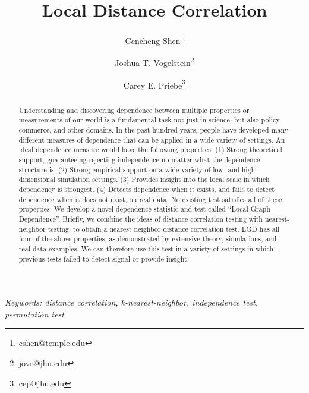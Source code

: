 \documentclass[11pt]{article}
\begin{document}
\def\spacingset#1{\renewcommand{\baselinestretch}%
{#1}\small\normalsize} \spacingset{1}

\title{\bf Local Distance Correlation}
\author[1]{Cencheng Shen\thanks{cshen@temple.edu}}
\author[2]{Joshua T. Vogelstein\thanks{jovo@jhu.edu}}
\author[3]{Carey E. Priebe\thanks{cep@jhu.edu}}
\maketitle


\bigskip
\begin{abstract}
Understanding and discovering dependence between multiple properties or measurements of our world is a fundamental task not just in science, but also policy, commerce, and other domains. In the past hundred years, people have developed many different measures of dependence that can be applied in a wide variety of settings.  An ideal dependence measure would have the following properties. (1) Strong theoretical support, guaranteeing rejecting independence no matter what the dependence structure is. (2) Strong empirical support on a wide variety of low- and high-dimensional simulation settings. (3) Provides insight into the local scale in which dependency is strongest. (4) Detects dependence when it exists, and fails to detect dependence when it does not exist, on real data. No existing test satisfies all of these properties. We develop a novel dependence statistic and test called ``Local Graph Dependence''.  Briefly, we combine the ideas of distance correlation testing with nearest-neighbor testing, to obtain a nearest neighbor distance correlation test.  LGD has all four of the above properties, as demonstrated by extensive theory, simulations, and real data examples. We can therefore use this test in a variety of settings in which previous tests failed to detect signal or provide insight.
\end{abstract}

\noindent%
{\it Keywords: distance correlation, k-nearest-neighbor, independence test, permutation test}  
\vfill

\tableofcontents


\newpage
\spacingset{1.45} %
\end{document}
